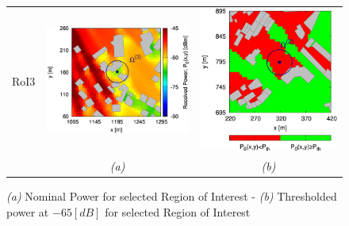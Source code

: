 \begin{figure}[H]
\begin{center}
\begin{tabular}{ccc}
\begin{sideways}RoI3\end{sideways}&\includegraphics[scale=0.1]{./Figure/Planning.EM/RoI3/3/Fig.Received.Power.ZOOM.H-QoS-03.Reference.jpg}&\includegraphics[scale=0.1]{./Figure/Planning.EM/RoI3/3/Fig.Received.Power.ZOOM.RoI.Reference.Threshold.-65dBm.jpg}\tabularnewline
&\emph{(a)}&\emph{(b)}\tabularnewline
\end{tabular}\end{center}
\caption{\footnotesize \emph{(a)} Nominal Power for selected Region of Interest - \emph{(b)}
Thresholded power at $-65[dB]$ for selected Region of Interest}
\end{figure}


